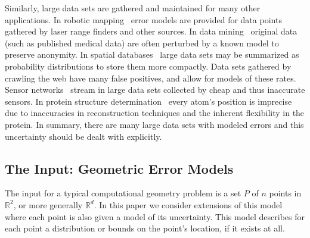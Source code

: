 \documentclass{journal}
\newcommand{\R}{\ensuremath{\mathbb{R}}}
\begin{document}
Similarly, large data sets are gathered and maintained for many other applications.
In robotic mapping~\cite{Thr02,EP04} error models are provided for data points gathered by laser range finders and other sources.
In data mining~\cite{AY08,AS00} original data (such as published medical data) are often perturbed by a known model to preserve anonymity.
In spatial databases~\cite{GS05,SC01,CKP03} large data sets may be summarized as probability distributions to store them more compactly.
Data sets gathered by crawling the web have many false positives, and allow for models of these rates.  
Sensor networks~\cite{DGMHH04} stream in large data sets collected by cheap and thus inaccurate sensors.
In protein structure determination~\cite{PYCDB06} every atom's position is imprecise due to inaccuracies in reconstruction techniques and the inherent flexibility in the protein.
In summary, there are many large data sets with modeled errors and this uncertainty should be dealt with explicitly.  








\subsection {The Input: Geometric Error Models}

The input for a typical computational geometry problem is a set $P$ of $n$ points in $\R^2$, or more generally $\R^d$.  In this paper we consider extensions of this model where each point is also given a model of its uncertainty.  This model describes for each point a distribution or bounds on the point's location, if it exists at all.  
\end{document}
